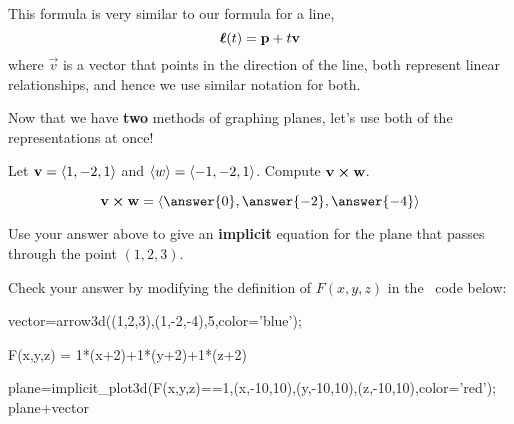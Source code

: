 \documentclass{ximera}
\begin{document}
This formula is very similar to our formula for a line,
\[
\boldsymbol{\ell}(t) = \mathbf{p} + t\mathbf{v}
\]
where $\vec{v}$ is a vector that points in the direction of the line,
both represent linear relationships, and hence we use similar notation
for both.

Now that we have \textbf{two} methods of graphing planes, let's use
both of the representations at once!

\begin{question}
  Let $\mathbf{v} = \left\langle 1,-2,1\right\rangle$ and $\left\langle w\right\rangle =
  \left\langle -1,-2,1\right\rangle$. Compute $\mathbf{v}\boldsymbol\times\mathbf{w}$.
  \begin{prompt}
    \[
    \vec{v}\cross\vec{w} = \vector{\answer{0},\answer{-2},\answer{-4}}
    \]
  \end{prompt}
  \begin{question}
    Use your answer above to give an \textbf{implicit} equation for
    the plane that passes through the point $(1,2,3)$.
    \begin{onlineOnly}
      Check your answer by modifying the definition of $F(x,y,z)$ in
      the \sage\ code below:
      \begin{sageCell}
vector=arrow3d((1,2,3),(1,-2,-4),5,color='blue');
        
F(x,y,z) = 1*(x+2)+1*(y+2)+1*(z+2)

plane=implicit_plot3d(F(x,y,z)==1,(x,-10,10),(y,-10,10),(z,-10,10),color='red');
plane+vector
      \end{sageCell}
    \end{onlineOnly}
  \end{question}
\end{question}
\end{document}

